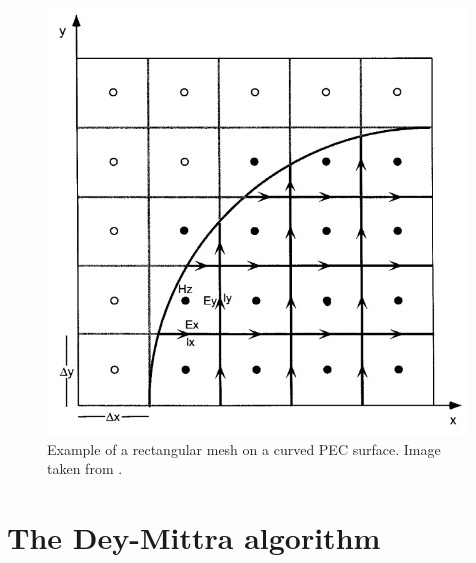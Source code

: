 \documentclass[12pt, oneside]{book}
\begin{document}
\begin{figure}[h]
    \centering
    \includegraphics[scale=1.0]{Imagenes/DeyMittra_2DMeshExample.jpg}
    \caption{Example of a rectangular mesh on a curved PEC surface. Image taken from \cite{Dey1997ALC}.}
    \label{fig:DeyMittraMesh}
\end{figure}

\section{The Dey-Mittra algorithm}
\end{document}
